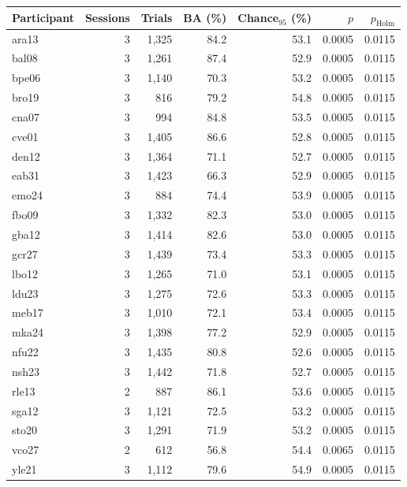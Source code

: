 \begin{tabular}{@{}lrrrrrr@{}}\toprule
Participant & Sessions & Trials & BA (\%) & Chance$_{95}$ (\%) & $p$ & $p_{\mathrm{Holm}}$\\\midrule
ara13 & 3 & 1,325 & 84.2 & 53.1 & 0.0005 & 0.0115\\
bal08 & 3 & 1,261 & 87.4 & 52.9 & 0.0005 & 0.0115\\
bpe06 & 3 & 1,140 & 70.3 & 53.2 & 0.0005 & 0.0115\\
bro19 & 3 & 816 & 79.2 & 54.8 & 0.0005 & 0.0115\\
cna07 & 3 & 994 & 84.8 & 53.5 & 0.0005 & 0.0115\\
cve01 & 3 & 1,405 & 86.6 & 52.8 & 0.0005 & 0.0115\\
den12 & 3 & 1,364 & 71.1 & 52.7 & 0.0005 & 0.0115\\
eab31 & 3 & 1,423 & 66.3 & 52.9 & 0.0005 & 0.0115\\
emo24 & 3 & 884 & 74.4 & 53.9 & 0.0005 & 0.0115\\
fbo09 & 3 & 1,332 & 82.3 & 53.0 & 0.0005 & 0.0115\\
gba12 & 3 & 1,414 & 82.6 & 53.0 & 0.0005 & 0.0115\\
gcr27 & 3 & 1,439 & 73.4 & 53.3 & 0.0005 & 0.0115\\
lbo12 & 3 & 1,265 & 71.0 & 53.1 & 0.0005 & 0.0115\\
ldu23 & 3 & 1,275 & 72.6 & 53.3 & 0.0005 & 0.0115\\
meb17 & 3 & 1,010 & 72.1 & 53.4 & 0.0005 & 0.0115\\
mka24 & 3 & 1,398 & 77.2 & 52.9 & 0.0005 & 0.0115\\
nfu22 & 3 & 1,435 & 80.8 & 52.6 & 0.0005 & 0.0115\\
nsh23 & 3 & 1,442 & 71.8 & 52.7 & 0.0005 & 0.0115\\
rle13 & 2 & 887 & 86.1 & 53.6 & 0.0005 & 0.0115\\
sga12 & 3 & 1,121 & 72.5 & 53.2 & 0.0005 & 0.0115\\
sto20 & 3 & 1,291 & 71.9 & 53.2 & 0.0005 & 0.0115\\
vco27 & 2 & 612 & 56.8 & 54.4 & 0.0065 & 0.0115\\
yle21 & 3 & 1,112 & 79.6 & 54.9 & 0.0005 & 0.0115\\
\bottomrule\end{tabular}

